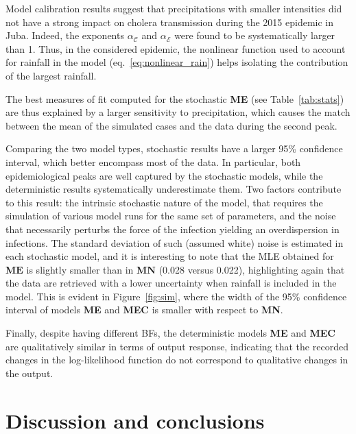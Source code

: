 Model calibration results suggest that precipitations with smaller intensities did not have a strong impact on cholera transmission during the 2015 epidemic in Juba. Indeed, the exponents $\alpha_{\mathcal{C}}$ and $\alpha_{\mathcal{E}}$ were found to be systematically larger than 1. %
  Thus, in the considered epidemic, the nonlinear function used to account for rainfall in the model (eq.~\ref{eq:nonlinear_rain}) helps isolating the contribution of the largest rainfall.

The best measures of fit computed for the stochastic \textbf{ME} (see Table~\ref{tab:stats}) are thus explained by a larger sensitivity to precipitation, which causes the match between the mean of the simulated cases and the data during the second peak.

Comparing the two model types, stochastic results have a larger 95\% confidence interval, which better encompass most of the data. In particular, both epidemiological peaks are well captured by the stochastic models, while the deterministic results systematically underestimate them. Two factors contribute to this result: the intrinsic stochastic nature of the model, that requires the simulation of various model runs for the same set of parameters, and the noise that necessarily perturbs the force of the infection yielding an overdispersion in infections. The standard deviation of such (assumed white) noise is estimated in each stochastic model, and it is interesting to note that the MLE obtained for $\mathbf{ME}$ is slightly smaller than in $\mathbf{MN}$ (0.028 versus 0.022), highlighting again that the data are retrieved with a lower uncertainty when rainfall is included in the model. This is evident in Figure~\ref{fig:sim}, where the width of the 95\% confidence interval of models \textbf{ME} and \textbf{MEC} is smaller with respect to \textbf{MN}.

Finally, despite having different BFs, the deterministic models \textbf{ME} and \textbf{MEC} are qualitatively similar in terms of output response, indicating that the recorded changes in the log-likelihood function do not correspond to qualitative changes in the output.

\section{Discussion and conclusions}
\label{sec:disc}


